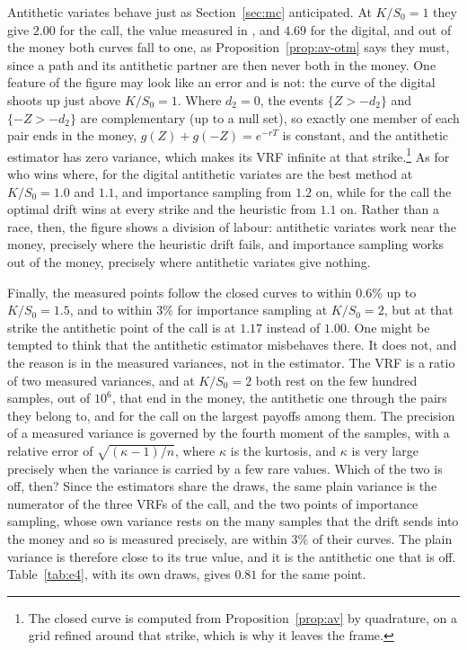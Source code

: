 \documentclass[11pt,a4paper]{article}
\theoremstyle{plain}
\theoremstyle{definition}
\theoremstyle{remark}
\newcommand{\1}{\mathbf{1}}
\begin{document}
Antithetic variates behave just as Section~\ref{sec:mc} anticipated. At $K/S_0 = 1$ they give $2.00$ for the call, the value measured in \cite{portfolio}, and $4.69$ for the digital, and out of the money both curves fall to one, as Proposition~\ref{prop:av-otm} says they must, since a path and its antithetic partner are then never both in the money. One feature of the figure may look like an error and is not: the curve of the digital shoots up just above $K/S_0 = 1$. Where $d_2 = 0$, the events $\{Z > -d_2\}$ and $\{-Z > -d_2\}$ are complementary (up to a null set), so exactly one member of each pair ends in the money, $g(Z) + g(-Z) = e^{-rT}$ is constant, and the antithetic estimator has zero variance, which makes its VRF infinite at that strike.\footnote{The closed curve is computed from Proposition~\ref{prop:av} by quadrature, on a grid refined around that strike, which is why it leaves the frame.} As for who wins where, for the digital antithetic variates are the best method at $K/S_0 = 1.0$ and $1.1$, and importance sampling from $1.2$ on, while for the call the optimal drift wins at every strike and the heuristic from $1.1$ on. Rather than a race, then, the figure shows a division of labour: antithetic variates work near the money, precisely where the heuristic drift fails, and importance sampling works out of the money, precisely where antithetic variates give nothing.

Finally, the measured points follow the closed curves to within $0.6\%$ up to $K/S_0 = 1.5$, and to within $3\%$ for importance sampling at $K/S_0 = 2$, but at that strike the antithetic point of the call is at $1.17$ instead of $1.00$. One might be tempted to think that the antithetic estimator misbehaves there. It does not, and the reason is in the measured variances, not in the estimator. The VRF is a ratio of two measured variances, and at $K/S_0 = 2$ both rest on the few hundred samples, out of $10^6$, that end in the money, the antithetic one through the pairs they belong to, and for the call on the largest payoffs among them. The precision of a measured variance is governed by the fourth moment of the samples, with a relative error of $\sqrt{(\kappa - 1)/n}$, where $\kappa$ is the kurtosis, and $\kappa$ is very large precisely when the variance is carried by a few rare values. Which of the two is off, then? Since the estimators share the draws, the same plain variance is the numerator of the three VRFs of the call, and the two points of importance sampling, whose own variance rests on the many samples that the drift sends into the money and so is measured precisely, are within $3\%$ of their curves. The plain variance is therefore close to its true value, and it is the antithetic one that is off. Table~\ref{tab:e4}, with its own draws, gives $0.81$ for the same point.
\end{document}
